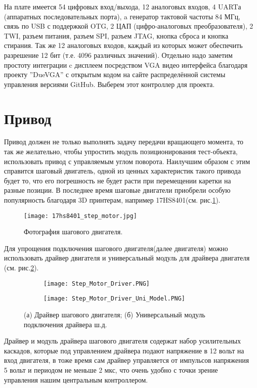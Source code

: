 На плате имеется 54 цифровых вход/выхода, 12 аналоговых входов, 4 UARTа (аппаратных последовательных порта), a генератор тактовой частоты 84 МГц, связь по USB с поддержкой OTG, 2 ЦАП (цифро-аналоговых преобразователя), 2 TWI, разъем питания,  разъем SPI, разъем JTAG, кнопка сброса и кнопка стирания. Так же 12 аналоговых входов, каждый из которых может обеспечить разрешение 12 бит (т.е. 4096 различных значений).
Отдельно надо заметим простоту интеграции c дисплеем посредством VGA видео интерфейса благодаря проекту ''DueVGA'' с открытым кодом на сайте распределённой системы управления версиями GitHub\cite{s_2}. Выберем этот контроллер для проекта.

\section{Привод}
Привод должен не только выполнять задачу передачи вращающего момента, то так же желательно, чтобы упростить модуль позиционирования тест-объекта, использовать привод с управляемым углом поворота. Наилучшим образом с этим справится шаговый двигатель, одной из ценных характеристик такого привода будет то, что его погрешность не будет расти при перемещении каретки на разные позиции. В последнее время шаговые двигатели приобрели особую популярность благодаря 3D принтерам, например 17HS8401(см. рис.\ref{fig:17hs8401_step_motor}).
\begin{figure}[ht]
	\centering
     \texttt{[image: 17hs8401\_step\_motor.jpg]}
	\caption{Фотография шагового двигателя.}
	\label{fig:17hs8401_step_motor}
\end{figure}
Для упрощения подключения шагового двигателя(далее двигателя) можно использовать драйвер двигателя и универсальный модуль для драйвера двигателя (см. рис.\ref{fig:Step_Motor_Driver}).
\begin{figure}[h]
    \centering
    \begin{subfigure}[b]{0.45\textwidth}
    \centering
        \texttt{[image: Step\_Motor\_Driver.PNG]}
        \caption{}
    \end{subfigure}
    \begin{subfigure}[b]{0.45\textwidth}
    \centering
        \texttt{[image: Step\_Motor\_Driver\_Uni\_Model.PNG]}
        \caption{}
    \end{subfigure}
    \caption{(а) Драйвер шагового двигателя;
    (б) Универсальный модуль подключения драйвера ш.д.}
    \label{fig:Step_Motor_Driver}
\end{figure}
Драйвер и модуль драйвера шагового двигателя содержат набор усилительных каскадов, которые под управлением драйвера подают напряжение в 12 вольт на вход двигателя, в тоже время сам драйвер управляется от импульсов напряжения 5 вольт и периодом не меньше 2 мкс, что очень удобно с точки зрение управления нашим центральным контроллером.


